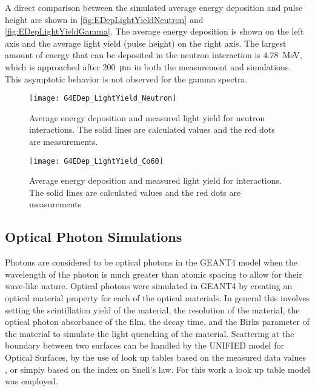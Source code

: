 A direct comparison between the simulated average energy deposition and pulse height are shown in \autoref{fig:EDepLightYieldNeutron} and \autoref{fig:EDepLightYieldGamma}. 
The average energy deposition is shown on the left axis and the average light yield (pulse height) on the right axis.
The largest amount of energy that can be deposited in the neutron interaction is \SI{4.78}{\MeV}, which is approached after \SI{200}{\um} in both the measurement and simulations.
This asymptotic behavior is not observed for the gamma spectra.
\begin{figure}
	\centering
    	\texttt{[image: G4EDep\_LightYield\_Neutron]}
	\caption[Average Light Yield and Energy Deposition for neutron interactions in PS]{Average energy deposition and measured light yield for neutron interactions. The solid lines are calculated values and the red dots are measurements.}
	\label{fig:EDepLightYieldNeutron}
\end{figure}
\begin{figure}
	\centering
    	\texttt{[image: G4EDep\_LightYield\_Co60]}
	\caption[Average Light Yield and Energy Deposition for Gamma interactions in PS]{Average energy deposition and measured light yield for  interactions. The solid lines are calculated values and the red dots are measurements}
	\label{fig:EDepLightYieldGamma}
\end{figure}

\subsection{Optical Photon Simulations}
\label{sec:OpticalPhotonSims}
Photons are considered to be optical photons in the GEANT4 model when the wavelength of the photon is much greater than atomic spacing to allow for their wave-like nature.
Optical photons were simulated in GEANT4 by creating an optical material property for each of the optical materials.
In general this involves setting the scintillation yield of the material, the resolution of the material, the optical photon absorbance of the film, the decay time, and the Birks parameter of the material to simulate the light quenching of the material.
Scattering at the boundary between two surfaces can be  handled by the UNIFIED model for Optical Surfaces, by the use of look up tables based on the measured data values \cite{5485130}, or simply based on the index on Snell's law.
For this work a look up table model was employed.


